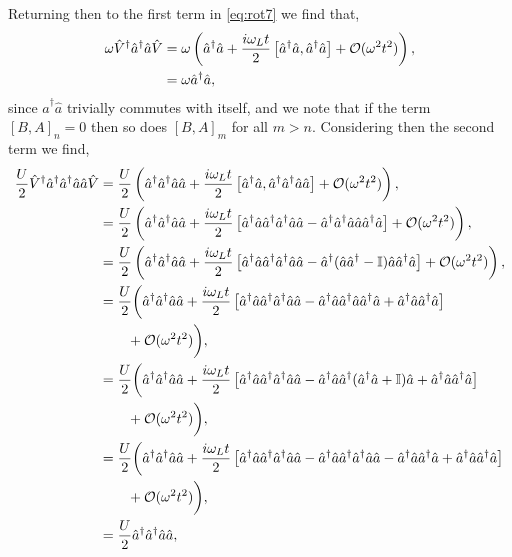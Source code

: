 Returning then to the first term in \cref{eq:rot7} we find that,
\begin{align}
	\omega\hat{V}^{\dagger}\hat{a}^{\dagger}\hat{a}\hat{V} &= \omega\left(\hat{a}^{\dagger}\hat{a} + \frac{i\omega_{L}t}{2}\left[\hat{a}^{\dagger}\hat{a}, \hat{a}^{\dagger}\hat{a}\right] + \mathcal{O}(\omega^{2}t^{2})\right), \notag \\
	&= \omega\hat{a}^{\dagger}\hat{a},
	\label{eq:rot13}
\end{align}
since \(\hat{a}^{\dagger}\hat{a}\) trivially commutes with itself, and we note that if the term \([B,A]_{n} = 0\) then so does \([B,A]_{m}\) for all \(m > n\). Considering then the second term we find,
\begin{align}
	\frac{U}{2}\hat{V}^{\dagger}\hat{a}^{\dagger}\hat{a}^{\dagger}\hat{a}\hat{a}\hat{V} &= \frac{U}{2} \left( \hat{a}^{\dagger}\hat{a}^{\dagger}\hat{a}\hat{a} + \frac{i\omega_{L}t}{2}\left[\hat{a}^{\dagger}\hat{a}, \hat{a}^{\dagger}\hat{a}^{\dagger}\hat{a}\hat{a}\right] + \mathcal{O}(\omega^{2}t^{2}) \right), \notag \\
	&= \frac{U}{2}\left( \hat{a}^{\dagger}\hat{a}^{\dagger}\hat{a}\hat{a} + \frac{i\omega_{L}t}{2}\left[\hat{a}^{\dagger}\hat{a}\hat{a}^{\dagger}\hat{a}^{\dagger}\hat{a}\hat{a} - \hat{a}^{\dagger}\hat{a}^{\dagger}\hat{a}\hat{a}\hat{a}^{\dagger}\hat{a} \right] + \mathcal{O}(\omega^{2}t^{2}) \right), \notag \\
	&= \frac{U}{2}\left( \hat{a}^{\dagger}\hat{a}^{\dagger}\hat{a}\hat{a} + \frac{i\omega_{L}t}{2}\left[\hat{a}^{\dagger}\hat{a}\hat{a}^{\dagger}\hat{a}^{\dagger}\hat{a}\hat{a} - \hat{a}^{\dagger}(\hat{a}\hat{a}^{\dagger} - \mathbb{I})\hat{a}\hat{a}^{\dagger}\hat{a} \right] + \mathcal{O}(\omega^{2}t^{2}) \right), \notag \\
	&= \frac{U}{2}\biggl( \hat{a}^{\dagger}\hat{a}^{\dagger}\hat{a}\hat{a} + \frac{i\omega_{L}t}{2}\left[\hat{a}^{\dagger}\hat{a}\hat{a}^{\dagger}\hat{a}^{\dagger}\hat{a}\hat{a} - \hat{a}^{\dagger}\hat{a}\hat{a}^{\dagger}\hat{a}\hat{a}^{\dagger}\hat{a} + \hat{a}^{\dagger}\hat{a}\hat{a}^{\dagger}\hat{a} \right] \notag \\
	&\qquad + \mathcal{O}(\omega^{2}t^{2}) \biggr), \notag \\
	&= \frac{U}{2}\biggl( \hat{a}^{\dagger}\hat{a}^{\dagger}\hat{a}\hat{a} + \frac{i\omega_{L}t}{2}\left[\hat{a}^{\dagger}\hat{a}\hat{a}^{\dagger}\hat{a}^{\dagger}\hat{a}\hat{a} - \hat{a}^{\dagger}\hat{a}\hat{a}^{\dagger}(\hat{a}^{\dagger}\hat{a} + \mathbb{I})\hat{a} + \hat{a}^{\dagger}\hat{a}\hat{a}^{\dagger}\hat{a} \right] \notag \\
	&\qquad + \mathcal{O}(\omega^{2}t^{2}) \biggr), \notag \\
	&= \frac{U}{2}\biggl( \hat{a}^{\dagger}\hat{a}^{\dagger}\hat{a}\hat{a} + \frac{i\omega_{L}t}{2}\left[\hat{a}^{\dagger}\hat{a}\hat{a}^{\dagger}\hat{a}^{\dagger}\hat{a}\hat{a} - \hat{a}^{\dagger}\hat{a}\hat{a}^{\dagger}\hat{a}^{\dagger}\hat{a}\hat{a} - \hat{a}^{\dagger}\hat{a}\hat{a}^{\dagger}\hat{a} + \hat{a}^{\dagger}\hat{a}\hat{a}^{\dagger}\hat{a} \right] \notag \\
	&\qquad + \mathcal{O}(\omega^{2}t^{2}) \biggr), \notag \\
	&= \frac{U}{2}\hat{a}^{\dagger}\hat{a}^{\dagger}\hat{a}\hat{a},
	\label{eq:rot14}
\end{align}
